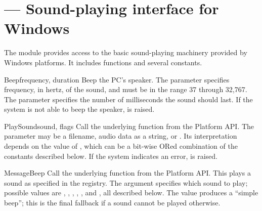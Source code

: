 \section{ ---
         Sound-playing interface for Windows}



The  module provides access to the basic
sound-playing machinery provided by Windows platforms.  It includes
functions and several constants.


\begin{funcdesc}{Beep}{frequency, duration}
  Beep the PC's speaker.
  The  parameter specifies frequency, in hertz, of the
  sound, and must be in the range 37 through 32,767.
  The  parameter specifies the number of milliseconds the
  sound should last.  If the system is not
  able to beep the speaker,  is raised.
\end{funcdesc}

\begin{funcdesc}{PlaySound}{sound, flags}
  Call the underlying  function from the
  Platform API.  The  parameter may be a filename, audio
  data as a string, or .  Its interpretation depends on the
  value of , which can be a bit-wise ORed combination of
  the constants described below.  If the system indicates an error,
   is raised.
\end{funcdesc}

\begin{funcdesc}{MessageBeep}{}
  Call the underlying  function from the
  Platform API.  This plays a sound as specified in the registry.  The
   argument specifies which sound to play; possible values
  are , , ,
  , , and , all
  described below.  The value  produces a ``simple beep'';
  this is the final fallback if a sound cannot be played otherwise.
\end{funcdesc}

